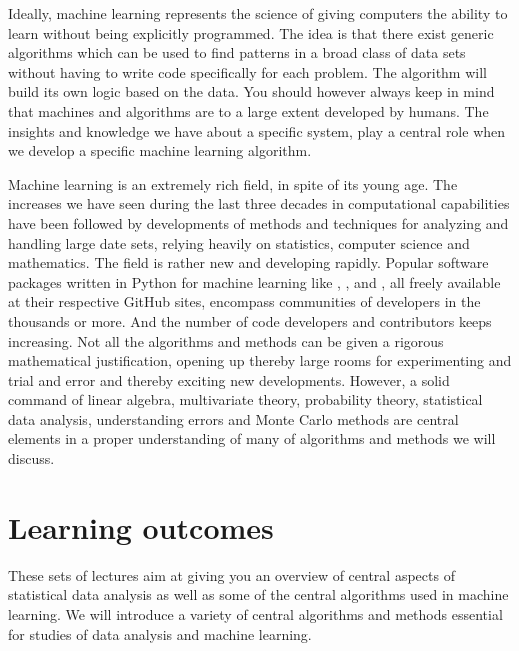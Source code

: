 \documentclass[letterpaper,10pt,english]{sphinxmanual}
\begin{document}
Ideally, machine learning represents the science of giving computers
the ability to learn without being explicitly programmed.  The idea is
that there exist generic algorithms which can be used to find patterns
in a broad class of data sets without having to write code
specifically for each problem. The algorithm will build its own logic
based on the data.  You should however always keep in mind that
machines and algorithms are to a large extent developed by humans. The
insights and knowledge we have about a specific system, play a central
role when we develop a specific machine learning algorithm.

Machine learning is an extremely rich field, in spite of its young
age. The increases we have seen during the last three decades in
computational capabilities have been followed by developments of
methods and techniques for analyzing and handling large date sets,
relying heavily on statistics, computer science and mathematics.  The
field is rather new and developing rapidly. Popular software packages
written in Python for machine learning like
,
,
 and , all
freely available at their respective GitHub sites, encompass
communities of developers in the thousands or more. And the number of
code developers and contributors keeps increasing. Not all the
algorithms and methods can be given a rigorous mathematical
justification, opening up thereby large rooms for experimenting and
trial and error and thereby exciting new developments.  However, a
solid command of linear algebra, multivariate theory, probability
theory, statistical data analysis, understanding errors and Monte
Carlo methods are central elements in a proper understanding of many
of algorithms and methods we will discuss.


\chapter{Learning outcomes}
\label{\detokenize{chapter1:learning-outcomes}}
These sets of lectures aim at giving you an overview of central aspects of
statistical data analysis as well as some of the central algorithms
used in machine learning.  We will introduce a variety of central
algorithms and methods essential for studies of data analysis and
machine learning.
\end{document}

